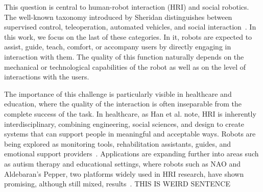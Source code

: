 This question is central to human-robot interaction (HRI) and social robotics.
The well-known taxonomy introduced by Sheridan distinguishes between supervised control, teleoperation, automated vehicles, and social interaction~\cite[525--526]{Sheridan2016HRI}.
In this work, we focus on the last of these categories. In it, robots are expected to assist, guide, teach, comfort, or accompany users by directly engaging in interaction with them.
The quality of this function naturally depends on the mechanical or technological capabilities of the robot as well as on the level of interactions with the users.



The importance of this challenge is particularly visible in healthcare and education, where the quality of the interaction is often inseparable from the complete success of the task. In healthcare, as Han et al. note, HRI is inherently interdisciplinary, combining engineering, social sciences, and design to create systems that can support people in meaningful and acceptable ways. Robots are being explored as monitoring tools, rehabilitation assistants, guides, and emotional support providers~\cite{Han2024HRIHealthcare}. Applications are expanding further into areas such as autism therapy and educational settings, where robots such as NAO and Aldebaran's Pepper, two platforms widely used in HRI research, have shown promising, although still mixed, results~\cite{Tapus2012AutismNao, aturhurra_leveraging_2024}. THIS IS WEIRD SENTENCE

